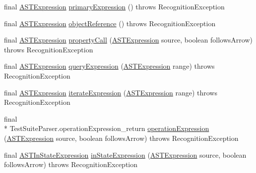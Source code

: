 \begin{DoxyCompactItemize}
\item 
final \hyperlink{classorg_1_1tzi_1_1use_1_1parser_1_1ocl_1_1_a_s_t_expression}{A\-S\-T\-Expression} \hyperlink{classorg_1_1tzi_1_1use_1_1parser_1_1testsuite_1_1_test_suite_parser_afabc6e8c06a4e20e00d0ea33310f0654}{primary\-Expression} ()  throws Recognition\-Exception 
\item 
final \hyperlink{classorg_1_1tzi_1_1use_1_1parser_1_1ocl_1_1_a_s_t_expression}{A\-S\-T\-Expression} \hyperlink{classorg_1_1tzi_1_1use_1_1parser_1_1testsuite_1_1_test_suite_parser_a40405c16f869f8278119e9e2b0be43c4}{object\-Reference} ()  throws Recognition\-Exception 
\item 
final \hyperlink{classorg_1_1tzi_1_1use_1_1parser_1_1ocl_1_1_a_s_t_expression}{A\-S\-T\-Expression} \hyperlink{classorg_1_1tzi_1_1use_1_1parser_1_1testsuite_1_1_test_suite_parser_a0a9f44fc2672016f2e3148799bc1065f}{property\-Call} (\hyperlink{classorg_1_1tzi_1_1use_1_1parser_1_1ocl_1_1_a_s_t_expression}{A\-S\-T\-Expression} source, boolean follows\-Arrow)  throws Recognition\-Exception 
\item 
final \hyperlink{classorg_1_1tzi_1_1use_1_1parser_1_1ocl_1_1_a_s_t_expression}{A\-S\-T\-Expression} \hyperlink{classorg_1_1tzi_1_1use_1_1parser_1_1testsuite_1_1_test_suite_parser_a8a4b3aa936450054598de64d229dac83}{query\-Expression} (\hyperlink{classorg_1_1tzi_1_1use_1_1parser_1_1ocl_1_1_a_s_t_expression}{A\-S\-T\-Expression} range)  throws Recognition\-Exception 
\item 
final \hyperlink{classorg_1_1tzi_1_1use_1_1parser_1_1ocl_1_1_a_s_t_expression}{A\-S\-T\-Expression} \hyperlink{classorg_1_1tzi_1_1use_1_1parser_1_1testsuite_1_1_test_suite_parser_a92a7ca18ae8e6da3579818349a2593ae}{iterate\-Expression} (\hyperlink{classorg_1_1tzi_1_1use_1_1parser_1_1ocl_1_1_a_s_t_expression}{A\-S\-T\-Expression} range)  throws Recognition\-Exception 
\item 
final \\*
Test\-Suite\-Parser.\-operation\-Expression\-\_\-return \hyperlink{classorg_1_1tzi_1_1use_1_1parser_1_1testsuite_1_1_test_suite_parser_a2b662b6af69d11d397d90a9a8e4cf0f6}{operation\-Expression} (\hyperlink{classorg_1_1tzi_1_1use_1_1parser_1_1ocl_1_1_a_s_t_expression}{A\-S\-T\-Expression} source, boolean follows\-Arrow)  throws Recognition\-Exception 
\item 
final \hyperlink{classorg_1_1tzi_1_1use_1_1parser_1_1ocl_1_1_a_s_t_in_state_expression}{A\-S\-T\-In\-State\-Expression} \hyperlink{classorg_1_1tzi_1_1use_1_1parser_1_1testsuite_1_1_test_suite_parser_a305c210b5765fffdfc4232c327e31344}{in\-State\-Expression} (\hyperlink{classorg_1_1tzi_1_1use_1_1parser_1_1ocl_1_1_a_s_t_expression}{A\-S\-T\-Expression} source, boolean follows\-Arrow)  throws Recognition\-Exception 

\end{DoxyCompactItemize}
